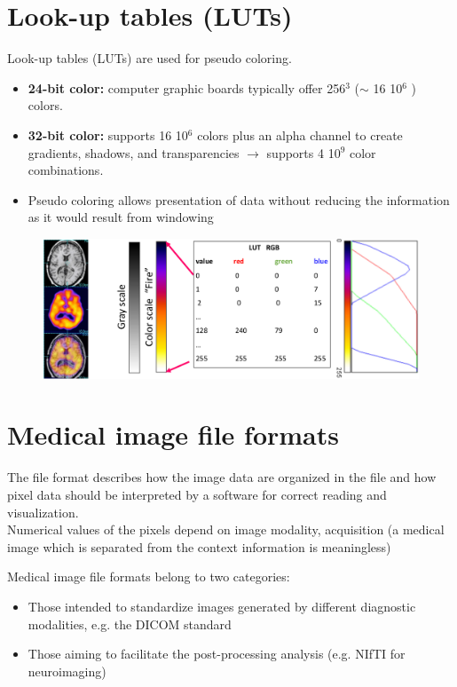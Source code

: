 \section{Look-up tables (LUTs)}

Look-up tables (LUTs) are used for pseudo coloring.
\begin{itemize}
	\item \textbf{24-bit color:} computer graphic boards typically offer 256$^3$ ($\sim$ 16 10$^6$ ) colors.
	\item \textbf{32-bit color:} supports 16 10$^6$ colors plus an alpha channel to create gradients,
	shadows, and transparencies $\rightarrow$ supports 4 10$^9$ color combinations.
	\item Pseudo coloring allows presentation of data without reducing the information as it
	would result from windowing
\end{itemize}

\begin{figure}[ht]
	\centering
	\includegraphics[width=0.9\linewidth]{figure_med/luts}
\end{figure}
\FloatBarrier

\section{Medical image file formats}

The file format describes how the image data are organized in the file and how pixel data should be interpreted by a software for correct reading and visualization.\\
Numerical values of the pixels depend on image modality, acquisition (a medical image which is separated from the context information is meaningless)

Medical image file formats belong to two categories:
\begin{itemize}
	\item Those intended to standardize images generated by different diagnostic modalities, e.g. the DICOM standard
	\item Those aiming to facilitate the post-processing analysis (e.g. NIfTI for neuroimaging)
\end{itemize}

